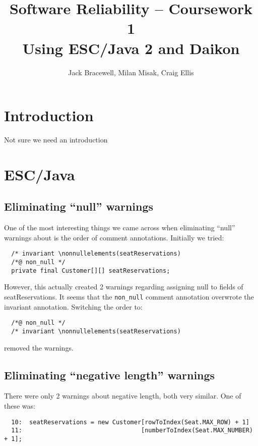 \documentclass{article}
\title{Software Reliability -- Coursework 1 \\ Using ESC/Java 2 and Daikon}
\author{Jack Bracewell, Milan Misak, Craig Ellis}
\date{}
\begin{document}
\maketitle

\section{Introduction}

Not sure we need an introduction

\section{ESC/Java}

\subsection{Eliminating ``null'' warnings}

One of the most interesting things we came across when eliminating ``null'' warnings about is the order of comment annotations. Initially we tried:

\begin{verbatim}
  /* invariant \nonnullelements(seatReservations)
  /*@ non_null */
  private final Customer[][] seatReservations;
\end{verbatim}

However, this actually created 2 warnings regarding assigning null to fields of seatReservations. It seems that the \verb|non_null| comment annotation overwrote the invariant annotation. Switching the order to:

\begin{verbatim}
  /*@ non_null */
  /* invariant \nonnullelements(seatReservations)
\end{verbatim}

removed the warnings.

\subsection{Eliminating ``negative length'' warnings}

There were only 2 warnings about negative length, both very similar. One of these was:

\begin{verbatim}
  10:  seatReservations = new Customer[rowToIndex(Seat.MAX_ROW) + 1]
  11:                                 [numberToIndex(Seat.MAX_NUMBER) + 1];
\end{verbatim}
\end{document}
